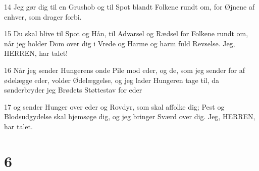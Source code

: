 \par 14 Jeg gør dig til en Grushob og til Spot blandt Folkene rundt om, for Øjnene af enhver, som drager forbi.
\par 15 Du skal blive til Spot og Hån, til Advarsel og Rædsel for Folkene rundt om, når jeg holder Dom over dig i Vrede og Harme og harm fuld Revselse. Jeg, HERREN, har talet!
\par 16 Når jeg sender Hungerens onde Pile mod eder, og de, som jeg sender for af ødelægge eder, volder Ødelæggelse, og jeg lader Hungeren tage til, da sønderbryder jeg Brødets Støttestav for eder
\par 17 og sender Hunger over eder og Rovdyr, som skal affolke dig; Pest og Blodsudgydelse skal hjemsøge dig, og jeg bringer Sværd over dig. Jeg, HERREN, har talet.

\chapter{6}

